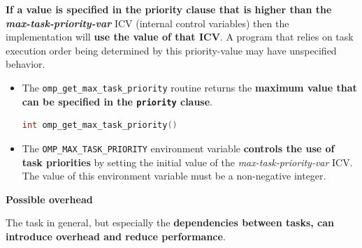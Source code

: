 \highspace
\textbf{If a value is specified in the priority clause that is higher than the \emph{max-task-priority-var}} ICV (internal control variables) then the implementation will \textbf{use the value of that ICV}. A program that relies on task execution order being determined by this priority-value may have unspecified behavior.
\begin{itemize}
    \item The \texttt{omp\_get\_max\_task\_priority} routine returns the \textbf{maximum value that can be specified in the \texttt{priority} clause}.
    \begin{openmpbox}
        \begin{lstlisting}[language=C++]
int omp_get_max_task_priority()\end{lstlisting}
    \end{openmpbox}

    \item The \texttt{OMP\_MAX\_TASK\_PRIORITY} environment variable \textbf{controls the use of task priorities} by setting the initial value of the \emph{max-task-priority-var} ICV. The value of this environment variable must be a non-negative integer.
\end{itemize}

\begin{flushleft}
    \textcolor{Red2}{ \textbf{Possible overhead}}
\end{flushleft}
The task in general, but especially the \textbf{dependencies between tasks, can introduce overhead and reduce performance}.

\newpage

